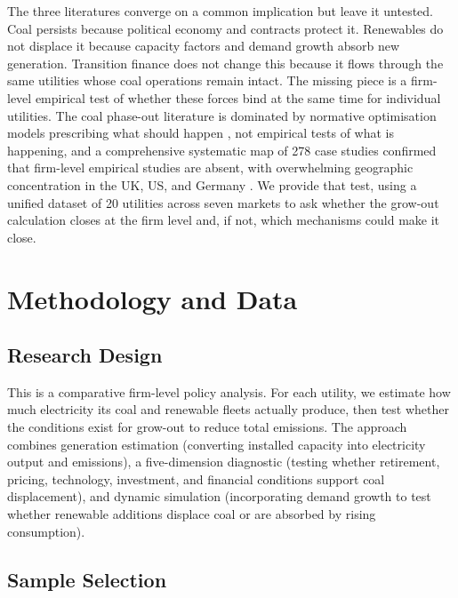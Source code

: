 \documentclass[review,3p,authoryear]{elsarticle}
\begin{document}
The three literatures converge on a common implication but leave it untested. Coal persists because political economy and contracts protect it. Renewables do not displace it because capacity factors and demand growth absorb new generation. Transition finance does not change this because it flows through the same utilities whose coal operations remain intact. The missing piece is a firm-level empirical test of whether these forces bind at the same time for individual utilities. The coal phase-out literature is dominated by normative optimisation models prescribing what should happen \citep{NatureComms2025India,Cui2019}, not empirical tests of what is happening, and a comprehensive systematic map of 278 case studies confirmed that firm-level empirical studies are absent, with overwhelming geographic concentration in the UK, US, and Germany \citep{Diluiso2021}. We provide that test, using a unified dataset of 20 utilities across seven markets to ask whether the grow-out calculation closes at the firm level and, if not, which mechanisms could make it close.

\section{Methodology and Data}
\label{sec:methodology}

\subsection{Research Design}

This is a comparative firm-level policy analysis. For each utility, we estimate how much electricity its coal and renewable fleets actually produce, then test whether the conditions exist for grow-out to reduce total emissions. The approach combines generation estimation (converting installed capacity into electricity output and emissions), a five-dimension diagnostic (testing whether retirement, pricing, technology, investment, and financial conditions support coal displacement), and dynamic simulation (incorporating demand growth to test whether renewable additions displace coal or are absorbed by rising consumption).

\subsection{Sample Selection}
\label{sec:data}
\end{document}
